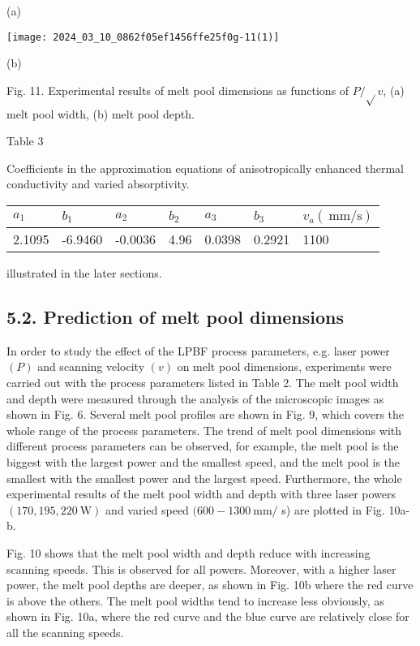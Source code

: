 \documentclass[10pt]{article}
\begin{document}
(a)

\begin{center}
\texttt{[image: 2024\_03\_10\_0862f05ef1456ffe25f0g-11(1)]}
\end{center}

(b)

Fig. 11. Experimental results of melt pool dimensions as functions of $P / \sqrt{ } v$, (a) melt pool width, (b) melt pool depth.

Table 3

Coefficients in the approximation equations of anisotropically enhanced thermal conductivity and varied absorptivity.

\begin{center}
\begin{tabular}{lllllll}
\hline
$a_{1}$ & $b_{1}$ & $a_{2}$ & $b_{2}$ & $a_{3}$ & $b_{3}$ & $v_{a}(\mathrm{~mm} / \mathrm{s})$ \\
\hline
2.1095 & -6.9460 & -0.0036 & 4.96 & 0.0398 & 0.2921 & 1100 \\
\hline
\end{tabular}
\end{center}

illustrated in the later sections.

\subsection*{5.2. Prediction of melt pool dimensions}
In order to study the effect of the LPBF process parameters, e.g. laser power $(P)$ and scanning velocity $(v)$ on melt pool dimensions, experiments were carried out with the process parameters listed in Table 2. The melt pool width and depth were measured through the analysis of the microscopic images as shown in Fig. 6. Several melt pool profiles are shown in Fig. 9, which covers the whole range of the process parameters. The trend of melt pool dimensions with different process parameters can be observed, for example, the melt pool is the biggest with the largest power and the smallest speed, and the melt pool is the smallest with the smallest power and the largest speed. Furthermore, the whole experimental results of the melt pool width and depth with three laser powers $(170,195,220 \mathrm{~W})$ and varied speed $(600-1300 \mathrm{~mm} /$ s) are plotted in Fig. 10a-b.

Fig. 10 shows that the melt pool width and depth reduce with increasing scanning speeds. This is observed for all powers. Moreover, with a higher laser power, the melt pool depths are deeper, as shown in Fig. 10b where the red curve is above the others. The melt pool widths tend to increase less obviously, as shown in Fig. 10a, where the red curve and the blue curve are relatively close for all the scanning speeds.
\end{document}
